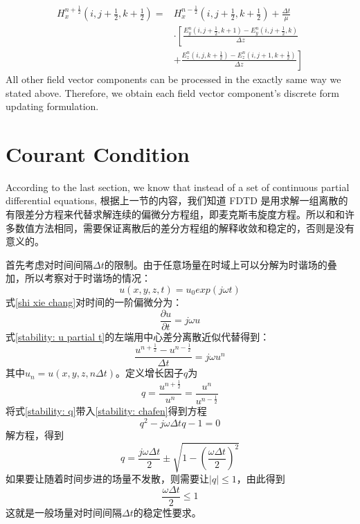 \begin{equation}\label{ch2 eq:hx discrete simple}
\begin{split}
H^{n+\frac{1}{2}}_{x}\left( i,j+\frac{1}{2},k+\frac{1}{2} \right)=&H^{n-\frac{1}{2}}_{x}\left( i,j+\frac{1}{2},k+\frac{1}{2} \right)+\frac{\Delta t}{\mu}\\
{}&\cdot\left[
\frac{
	E^n_y\left(i,j+\frac{1}{2},k+1\right)-E^n_y\left(i,j+\frac{1}{2},k\right)
	}{\Delta z}\right.\\
{}&+\left.
\frac{
	E^n_z\left(i,j,k+\frac{1}{2}\right)-E^n_z\left(i,j+1,k+\frac{1}{2}\right)
}{\Delta z}
\right]
\end{split}
\end{equation}
All other field vector components can be processed in the exactly same way we stated above. Therefore, we obtain each field vector component's discrete form updating formulation.

\section{Courant Condition}
According to the last section, we know that instead of a set of continuous partial differential equations, 
根据上一节的内容，我们知道 FDTD 是用求解一组离散的有限差分方程来代替求解连续的偏微分方程组，即麦克斯韦旋度方程。所以和和许多数值方法相同，需要保证离散后的差分方程组的解释收敛和稳定的，否则是没有意义的。

首先考虑对时间间隔$\Delta t$的限制。由于任意场量在时域上可以分解为时谐场的叠加，所以考察对于时谐场的情况：
\begin{equation}\label{stability: shi xie chang}
u(x,y,z,t)=u_0exp(j\omega t)
\end{equation}
式\eqref{shi xie chang}对时间的一阶偏微分为：
\begin{equation}\label{stability: u partial t}
\frac{\partial u}{\partial t}=j\omega u
\end{equation}
式\eqref{stability: u partial t}的左端用中心差分离散近似代替得到：
\begin{equation}\label{stability: chafen}
\frac{u^{n+\frac{1}{2}}-u^{n-\frac{1}{2}}}{\Delta t}=j\omega u^n
\end{equation}
其中$u_n=u(x,y,z,n\Delta t)$。定义增长因子$q$为
\begin{equation}\label{stability: q}
	q=\frac{u^{n+\frac{1}{2}}}{u^n}=\frac{u^n}{u^{n-\frac{1}{2}}}
\end{equation}
将式\eqref{stability: q}带入\eqref{stability: chafen}得到方程
\begin{equation}
q^2-j\omega \Delta tq-1=0
\end{equation}
解方程，得到
\begin{equation}
q=\frac{j\omega \Delta t}{2}\pm\sqrt{1-\left(\frac{\omega \Delta  t}{2}\right)^2}
\end{equation}
如果要让随着时间步进的场量不发散，则需要让$|q|\leqslant 1$，由此得到
\begin{equation}\label{stability: dt}
\frac{\omega \Delta t}{2}\leqslant 1
\end{equation}
这就是一般场量对时间间隔$\Delta t$的稳定性要求。

